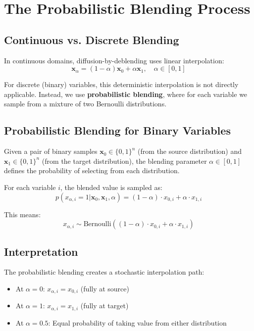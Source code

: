 \documentclass[11pt,a4paper]{article}
\newcommand{\vx}{\mathbf{x}}
\begin{document}
\section{The Probabilistic Blending Process}

\subsection{Continuous vs. Discrete Blending}

In continuous domains, diffusion-by-deblending uses linear interpolation:
\begin{equation}
    \vx_\alpha = (1-\alpha)\vx_0 + \alpha \vx_1, \quad \alpha \in [0,1]
\end{equation}

For discrete (binary) variables, this deterministic interpolation is not directly applicable. Instead, we use \textbf{probabilistic blending}, where for each variable we sample from a mixture of two Bernoulli distributions.

\subsection{Probabilistic Blending for Binary Variables}

Given a pair of binary samples $\vx_0 \in \{0,1\}^n$ (from the source distribution) and $\vx_1 \in \{0,1\}^n$ (from the target distribution), the blending parameter $\alpha \in [0,1]$ defines the probability of selecting from each distribution.

For each variable $i$, the blended value is sampled as:
\begin{equation}
    p(x_{\alpha,i} = 1 | \vx_0, \vx_1, \alpha) = (1-\alpha) \cdot x_{0,i} + \alpha \cdot x_{1,i}
\end{equation}

This means:
\begin{equation}
    x_{\alpha,i} \sim \text{Bernoulli}\left((1-\alpha) \cdot x_{0,i} + \alpha \cdot x_{1,i}\right)
\end{equation}

\subsection{Interpretation}

The probabilistic blending creates a stochastic interpolation path:
\begin{itemize}
    \item At $\alpha = 0$: $x_{\alpha,i} = x_{0,i}$ (fully at source)
    \item At $\alpha = 1$: $x_{\alpha,i} = x_{1,i}$ (fully at target)
    \item At $\alpha = 0.5$: Equal probability of taking value from either distribution
\end{itemize}
\end{document}

